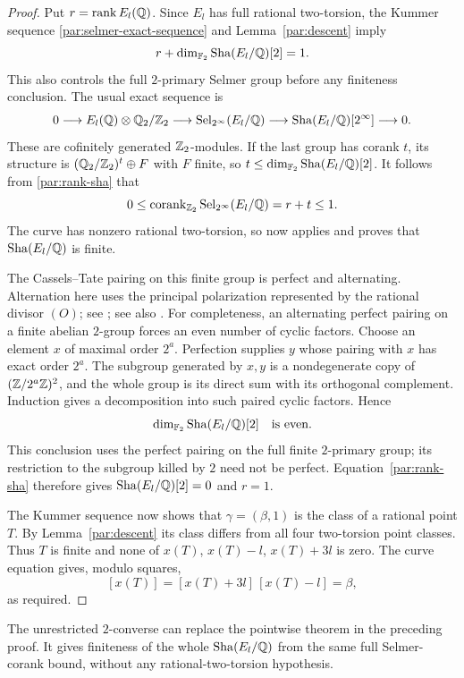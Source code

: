 \begin{proof}
Put $r=\operatorname{rank} E_l(\mathbb Q)$. Since $E_l$ has full rational two-torsion,
the Kummer sequence \eqref{par:selmer-exact-sequence} and
Lemma~\ref{par:descent} imply
\begin{equation}\label{par:rank-sha}
 r+\dim_{\mathbb F_2}\mathop{\mathrm{Sha}}(E_l/\mathbb Q)[2]=1.
\end{equation}
This also controls the full $2$-primary Selmer group before any
finiteness conclusion. The usual exact sequence is
\[
 0\longrightarrow E_l(\mathbb Q)\otimes\mathbb Q_2/\mathbb Z_2
 \longrightarrow\operatorname{Sel}_{2^\infty}(E_l/\mathbb Q)
 \longrightarrow\mathop{\mathrm{Sha}}(E_l/\mathbb Q)[2^\infty]\longrightarrow0.
\]
These are cofinitely generated $\mathbb Z_2$-modules. If the last group
has corank $t$, its structure is
$(\mathbb Q_2/\mathbb Z_2)^t\oplus F$ with $F$ finite, so
$t\le\dim_{\mathbb F_2}\mathop{\mathrm{Sha}}(E_l/\mathbb Q)[2]$. It follows from
\eqref{par:rank-sha} that
\[
 0\le\operatorname{corank}_{\mathbb Z_2}\operatorname{Sel}_{2^\infty}(E_l/\mathbb Q)=r+t\le1.
\]
The curve has nonzero rational two-torsion, so
\cite[Theorem~1.1]{PointwiseTwoConverse} now applies and proves
that $\mathop{\mathrm{Sha}}(E_l/\mathbb Q)$ is finite.

The Cassels--Tate pairing on this finite group is perfect and
alternating. Alternation here uses the principal polarization
represented by the rational divisor $(O)$; see
\cite{Cassels1962}; see also
\cite[Section~1 and Corollary~9]{PoonenStoll1999}. For completeness,
an alternating perfect pairing on a finite abelian $2$-group
forces an even number of cyclic factors. Choose an element $x$
of maximal order $2^a$. Perfection supplies $y$ whose pairing
with $x$ has exact order $2^a$. The subgroup generated by $x,y$
is a nondegenerate copy of $(\mathbb Z/2^a\mathbb Z)^2$, and the whole group
is its direct sum with its orthogonal complement. Induction gives
a decomposition into such paired cyclic factors. Hence
\[
 \dim_{\mathbb F_2}\mathop{\mathrm{Sha}}(E_l/\mathbb Q)[2]\quad\text{is even}.
\]
This conclusion uses the perfect pairing on the full finite
$2$-primary group; its restriction to the subgroup killed by $2$
need not be perfect. Equation~\eqref{par:rank-sha} therefore gives
$\mathop{\mathrm{Sha}}(E_l/\mathbb Q)[2]=0$ and $r=1$.

The Kummer sequence now shows that $\gamma=(\beta,1)$ is the
class of a rational point $T$. By Lemma~\ref{par:descent} its class
differs from all four two-torsion point classes. Thus $T$ is finite
and none of $x(T)$, $x(T)-l$, $x(T)+3l$ is zero. The curve equation
gives, modulo squares,
\[
 [x(T)]=[x(T)+3l]\,[x(T)-l]=\beta,
\]
as required.
\end{proof}


\begin{remark}
The unrestricted $2$-converse \cite[Theorem~1.1]{UnrestrictedTwoConverse}
can replace the pointwise theorem in the preceding proof. It gives
finiteness of the whole $\mathop{\mathrm{Sha}}(E_l/\mathbb Q)$ from the same full Selmer-corank
bound, without any rational-two-torsion hypothesis.
\end{remark}


